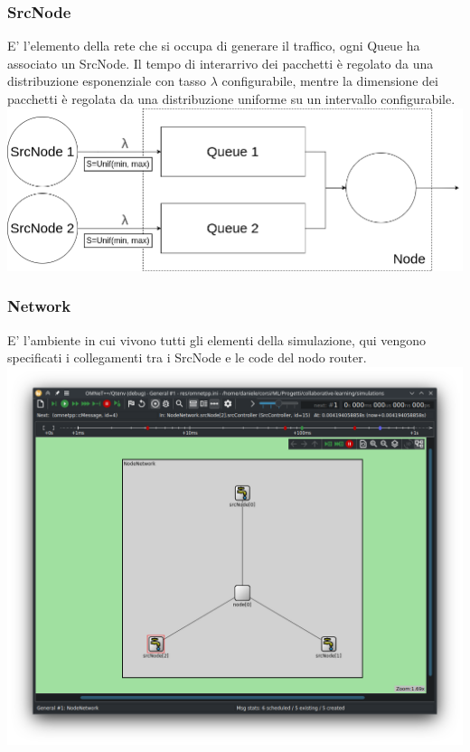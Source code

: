 \documentclass[compress]{beamer}
\begin{document}
\subsubsection{SrcNode}
\begin{frame}{\subsubsecname}
    E' l'elemento della rete che si occupa di generare il traffico, ogni Queue ha associato un SrcNode.
    Il tempo di interarrivo dei pacchetti è regolato da una distribuzione esponenziale con tasso $\lambda$ configurabile, mentre la dimensione dei pacchetti è regolata da una distribuzione uniforme su un intervallo configurabile.
    \begin{adjustbox}{margin=0.5cm 0cm 0.5cm 0.5cm, center} %
        \includegraphics[width=.8\textwidth]{figs/src_scheme.png}
    \end{adjustbox}
\end{frame}

\subsubsection{Network}
\begin{frame}{\subsubsecname}
E' l'ambiente in cui vivono tutti gli elementi della simulazione, qui vengono specificati i collegamenti tra i SrcNode e le code del nodo router. 
    \begin{adjustbox}{margin=0cm 0cm 0cm 0cm, center} %
        \includegraphics[width=.65\textwidth]{figs/network_layout_3queues.png}
    \end{adjustbox}
\end{frame}
\end{document}
